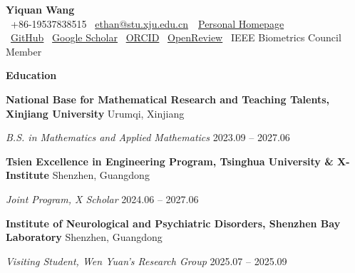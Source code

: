 \documentclass[11pt]{article}
\begin{document}
	\begin{center}
		\textbf{\Large Yiquan Wang}\\
		\textbullet \ +86-19537838515 \textbullet \ \href{mailto:ethan@stu.xju.edu.cn}{ethan@stu.xju.edu.cn}\ \textbullet \ \href{https://wyqmath.cn/en.html}{Personal Homepage} \\
		\textbullet \ \href{https://github.com/wyqmath}{GitHub} \textbullet \ \href{https://scholar.google.com/citations?user=ULP3e1cAAAAJ}{Google Scholar} \textbullet \ \href{https://orcid.org/0000-0003-1417-5752}{ORCID} \textbullet \ \href{https://openreview.net/profile?id=~Yiquan_Wang3}{OpenReview} \textbullet \ IEEE Biometrics Council Member \\
		\hrulefill
	\end{center}
	
	\vspace{2pt}
	
	\begin{center}
		\textbf{\large Education}
	\end{center}
	\textbf{National Base for Mathematical Research and Teaching Talents, Xinjiang University} \hfill Urumqi, Xinjiang
	
	\textit{B.S. in Mathematics and Applied Mathematics} \hfill 2023.09 – 2027.06
	
	\vspace{10pt}
	
	\textbf{Tsien Excellence in Engineering Program, Tsinghua University \& X-Institute} \hfill Shenzhen, Guangdong
	
	\textit{Joint Program, X Scholar} \hfill 2024.06 – 2027.06
	
	\vspace{10pt}
	
	\textbf{Institute of Neurological and Psychiatric Disorders, Shenzhen Bay Laboratory} \hfill Shenzhen, Guangdong
	
	\textit{Visiting Student, Wen Yuan's Research Group} \hfill 2025.07 – 2025.09
	
	\vspace{12pt}
	
\end{document}
